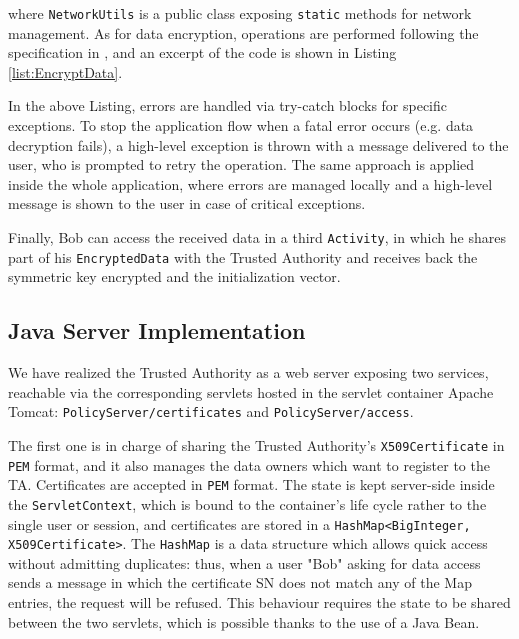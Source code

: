 \noindent where \texttt{NetworkUtils} is a public class exposing \texttt{static} methods for network management. As for data encryption, operations are performed following the specification in \cite{pearson2011sticky}, and an excerpt of the code is shown in Listing \ref{list:EncryptData}.


In the above Listing, errors are handled via try-catch blocks for specific exceptions. To stop the application flow when a fatal error occurs (e.g. data decryption fails), a high-level exception is thrown with a message delivered to the user, who is prompted to retry the operation. The same approach is applied inside the whole application, where errors are managed locally and a high-level message is shown to the user in case of critical exceptions.

Finally, Bob can access the received data in a third \texttt{Activity}, in which he shares part of his \texttt{EncryptedData} with the Trusted Authority and receives back the symmetric key encrypted and the initialization vector.

\subsection{Java Server Implementation}

We have realized the Trusted Authority as a web server exposing two services, reachable via the corresponding servlets hosted in the servlet container Apache Tomcat: \texttt{PolicyServer/certificates} and \texttt{PolicyServer/access}.

The first one is in charge of sharing the Trusted Authority's \texttt{X509Certificate} in \texttt{PEM} format, and it also manages the data owners which want to register to the TA. Certificates are accepted in \texttt{PEM} format. The state is kept server-side inside the \texttt{ServletContext}, which is bound to the container's life cycle rather to the single user or session, and certificates are stored in a \texttt{HashMap<BigInteger, X509Certificate>}. The \texttt{HashMap} is a data structure which allows quick access without admitting duplicates: thus, when a user "Bob" asking for data access sends a message in which the certificate SN does not match any of the Map entries, the request will be refused. This behaviour requires the state to be shared between the two servlets, which is possible thanks to the use of a Java Bean.

